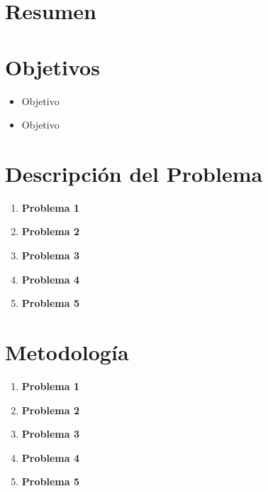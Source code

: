 \documentclass[letterpaper, titlepage]{article}
\begin{document}
\maketitle
\newpage
\section{Resumen}
\section{Objetivos}
	\begin{itemize}
		\item Objetivo
		\item Objetivo
	\end{itemize}
\newpage

\section{Descripción del Problema}
	\begin{enumerate}
		\item \textbf{Problema 1}
		
		\item \textbf{Problema 2}
		
		\item \textbf{Problema 3}
		
		\item \textbf{Problema 4}
		
		\item \textbf{Problema 5}
	\end{enumerate}
\newpage

\section{Metodología}
	\begin{enumerate}
		\item \textbf{Problema 1}
		
		\item \textbf{Problema 2}
		
		\item \textbf{Problema 3}
		
		\item \textbf{Problema 4}
		
		\item \textbf{Problema 5}
	\end{enumerate}
\newpage
\newpage
\end{document}
